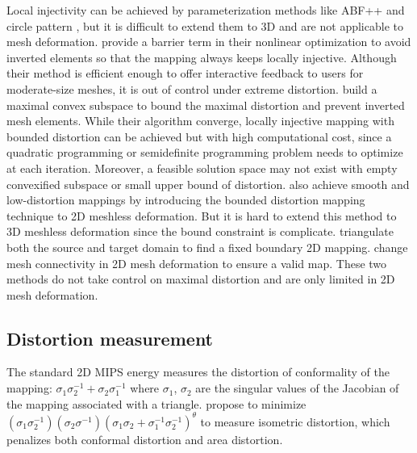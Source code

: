 Local injectivity can be achieved by parameterization methods like ABF++ \citep{sheffer2005abf++} and circle pattern \citep{kharevych2006discrete}, but it is difficult to extend them to 3D and are not applicable to mesh deformation. \citep{schuller2013locally} provide a barrier term in their nonlinear optimization to avoid inverted elements so that the mapping always keeps locally injective. Although their method is efficient enough to offer interactive feedback to users for moderate-size meshes, it is out of control under extreme distortion. \citep{lipman2012bounded} build a maximal convex subspace to bound the maximal distortion and prevent inverted mesh elements. While their algorithm converge, locally injective mapping with bounded distortion can be achieved but with high computational cost, since a quadratic programming or semidefinite programming problem needs to optimize at each iteration. Moreover, a feasible solution space may not exist with empty convexified subspace or small upper bound of distortion. \cite{poranne2014provably} also achieve smooth and low-distortion mappings by introducing the bounded distortion mapping technique to 2D meshless deformation. But it is hard to extend this method to 3D meshless deformation since the bound constraint is complicate. \cite{weber2014locally} triangulate both the source and target domain to find a fixed boundary 2D mapping. \citep{jin2014remeshing} change mesh connectivity in 2D mesh deformation to ensure a valid map. These two methods do not take control on maximal distortion and are only limited in 2D mesh deformation.

\subsection{Distortion measurement}
The standard 2D MIPS energy measures the distortion of conformality of the mapping: $\sigma _1 \sigma _2^{-1} + \sigma _2 \sigma _1^{-1}$ where $\sigma _1$, $\sigma _2$ are the singular values of the Jacobian of the mapping associated with a triangle. \cite{degener2003adaptable} propose to minimize $(\sigma _1 \sigma _2^{-1})(\sigma_2 \sigma^{-1})(\sigma_1 \sigma_2 + \sigma_1^{-1} \sigma_2^{-1})^\theta$ to measure isometric distortion, which penalizes both conformal distortion and area distortion.


